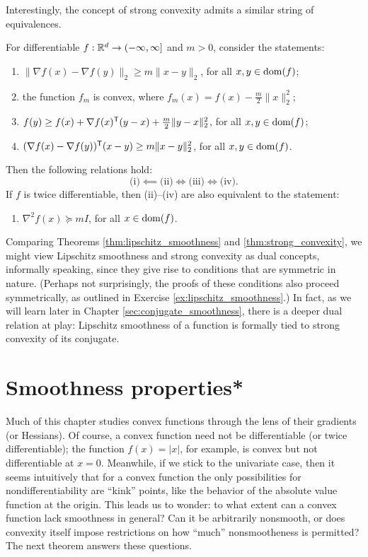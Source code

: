 Interestingly, the concept of strong convexity admits a similar string of
equivalences. 

\begin{Theorem}
\label{thm:strong_convexity}
For differentiable $f : \mathbb{R}^d \to (-\infty, \infty]$ and $m>0$, consider the
statements:  
\begin{enumerate}[label=(\roman*)]
\item $\|\nabla f(x) - \nabla f(y)\|_2 \geq m \|x-y\|_2$, for all $x,y \in
  \operatorname{dom}(f)$; 
\item the function $f_m$ is convex, where $f_m(x) = f(x) - \frac{m}{2}
  \|x\|_2^2$; 
\item $f(y) \geq f(x) + \nabla f(x)^{\mathsf{T}} (y-x) + \frac{m}{2} \|y-x\|_2^2$, for all
  $x,y \in \operatorname{dom}(f)$;
\item $(\nabla f(x) - \nabla f(y))^{\mathsf{T}} (x - y) \geq m\|x-y\|_2^2$, for all $x,y
  \in \operatorname{dom}(f)$. 
\end{enumerate}
Then the following relations hold: 
\[
\text{(i)} \impliedby \text{(ii)} \iff \text{(iii)} \iff \text{(iv)}. 
\]
If $f$ is twice differentiable, then (ii)--(iv) are also equivalent to the
statement:  
\begin{enumerate}
\item[(v)] $\nabla^2 f(x) \succeq mI$, for all $x \in \operatorname{dom}(f)$.
\end{enumerate}
\end{Theorem}

Comparing Theorems \ref{thm:lipschitz_smoothness} and
\ref{thm:strong_convexity}, we might view Lipschitz smoothness and strong
convexity as dual concepts, informally speaking, since they give rise to
conditions that are symmetric in nature. (Perhaps not surprisingly, the proofs
of these conditions also proceed symmetrically, as outlined in Exercise
\ref{ex:lipschitz_smoothness}.)  In fact, as we will learn later in Chapter 
\ref{sec:conjugate_smoothness}, there is a deeper dual relation at play:
Lipschitz smoothness of a function is formally tied to strong convexity of its 
conjugate.  

\section{Smoothness properties*}

Much of this chapter studies convex functions through the lens of their
gradients (or Hessians). Of course, a convex function need not be differentiable
(or twice differentiable); the function $f(x) = |x|$, for example, is convex but
not differentiable at $x=0$. Meanwhile, if we stick to the univariate case, then
it seems intuitively that for a convex function the only possibilities for
nondifferentiability are ``kink'' points, like the behavior of the absolute
value function at the origin. This leads us to wonder: to what extent can a
convex function lack smoothness in general? Can it be arbitrarily nonsmooth, or
does convexity itself impose restrictions on how ``much'' nonsmootheness is
permitted? The next theorem answers these questions.

